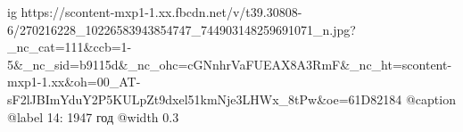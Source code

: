  
 
 
 
 

\ifcmt
  ig https://scontent-mxp1-1.xx.fbcdn.net/v/t39.30808-6/270216228_10226583943854747_744903148259691071_n.jpg?_nc_cat=111&ccb=1-5&_nc_sid=b9115d&_nc_ohc=cGNnhrVaFUEAX8A3RmF&_nc_ht=scontent-mxp1-1.xx&oh=00_AT-sF2lJBImYduY2P5KULpZt9dxel51kmNje3LHWx_8tPw&oe=61D82184
	@caption @label 14: 1947 год
  @width 0.3
\fi
